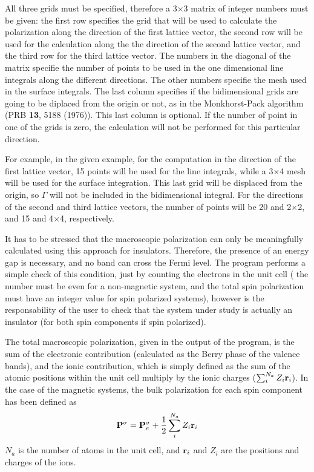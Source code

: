 \documentclass[11pt]{article}
\begin{document}
\begin{description}
All three grids must be specified, therefore a 3$\times$3 matrix of
integer numbers must be given: the first row specifies the grid that
will be used to calculate the polarization along the direction of the
first lattice vector, the second row will be used for the calculation
along the the direction of the second lattice vector, and the third
row for the third lattice vector.  The numbers in the diagonal of the
matrix specifie the number of points to be used in the one dimensional
line integrals along the different directions. The other numbers
specifie the mesh used in the surface integrals.  The last column
specifies if the bidimensional grids are going to be diplaced from the
origin or not, as in the Monkhorst-Pack algorithm (PRB {\bf 13}, 5188
(1976)).  This last column is optional.  If the number of point in one
of the grids is zero, the calculation will not be performed for this
particular direction.

For example, in the given example, for the computation in the
direction of the first lattice vector, 15 points will be used
for the line integrals, while a 3$\times$4 mesh will be used
for the surface integration. This last grid will be displaced 
from the origin, so $\Gamma$ will not be included in the 
bidimensional integral. For the directions of the second
and third lattice vectors, the number of points will be
20 and 2$\times$2, and 15 and 4$\times$4, respectively. 

It has to be stressed that the macroscopic polarization can only be
meaningfully calculated using this approach for insulators.
Therefore, the presence of an energy gap is necessary, and no band can
cross the Fermi level. The program performs a simple check of this
condition, just by counting the electrons in the unit cell ( the
number must be even for a non-magnetic system, and the total spin
polarization must have an integer value for spin polarized systems),
however is the responsability of the user to check that the system
under study is actually an insulator (for both spin components if spin
polarized).

The total macroscopic polarization, given in the output of the
program, is the sum of the electronic contribution (calculated as the
Berry phase of the valence bands), and the ionic contribution, which
is simply defined as the sum of the atomic positions within the unit
cell multiply by the ionic charges ($\sum_i^{N_a} Z_i {\bf r}_i$).  In
the case of the magnetic systems, the bulk polarization for each spin
component has been defined as
\begin{equation}
       {\bf P}^\sigma = {\bf P}_e^\sigma + 
   {1 \over 2} \sum_i^{N_a}  Z_i {\bf r}_i
\end{equation}
$N_a$ is the number of atoms in the unit cell, and ${\bf r}_i$ and
$Z_i$ 
are the positions and charges of the ions.


\end{description}
\end{document}
